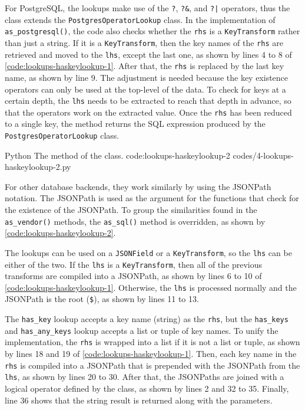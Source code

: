 For PostgreSQL, the lookups make use of the \verb|?|, \verb|?&|, and \verb=?|=
operators, thus the class extends the \verb|PostgresOperatorLookup| class. In
the implementation of \verb|as_postgresql()|, the code also checks whether the
\verb|rhs| is a \verb|KeyTransform| rather than just a string. If it is a
\verb|KeyTransform|, then the key names of the \verb|rhs| are retrieved and
moved to the \verb|lhs|, except the last one, as shown by lines 4 to 8 of
\autoref{code:lookups-haskeylookup-1}. After that, the \verb|rhs| is replaced
by the last key name, as shown by line 9. The adjustment is needed because the
key existence operators can only be used at the top-level of the data. To
check for keys at a certain depth, the \verb|lhs| needs to be extracted to
reach that depth in advance, so that the operators work on the extracted value.
Once the \verb|rhs| has been reduced to a single key, the method returns the
SQL expression produced by the \verb|PostgresOperatorLookup| class.

\listing
{Python}
{The  method of the  class.}
{code:lookups-haskeylookup-2}
{codes/4-lookups-haskeylookup-2.py}

For other database backends, they work similarly by using the JSONPath
notation. The JSONPath is used as the argument for the functions that check for
the existence of the JSONPath. To group the similarities found in the
\verb|as_vendor()| methods, the \verb|as_sql()| method is overridden, as shown
by \autoref{code:lookups-haskeylookup-2}.

The lookups can be used on a \verb|JSONField| or a \verb|KeyTransform|, so the
\verb|lhs| can be either of the two. If the \verb|lhs| is a
\verb|KeyTransform|, then all of the previous transforms are compiled into a
JSONPath, as shown by lines 6 to 10 of \autoref{code:lookups-haskeylookup-1}.
Otherwise, the \verb|lhs| is processed normally and the JSONPath is the root
(\verb|$|), as shown by lines 11 to 13.

The \verb|has_key| lookup accepts a key name (string) as the \verb|rhs|, but
the \verb|has_keys| and \verb|has_any_keys| lookup accepts a list or tuple of
key names. To unify the implementation, the \verb|rhs| is wrapped into a list
if it is not a list or tuple, as shown by lines 18 and 19 of
\autoref{code:lookups-haskeylookup-1}. Then, each key name in the \verb|rhs| is
compiled into a JSONPath that is prepended with the JSONPath from the
\verb|lhs|, as shown by lines 20 to 30. After that, the JSONPaths are joined
with a logical operator defined by the class, as shown by lines 2 and 32 to 35.
Finally, line 36 shows that the string result is returned along with the
parameters.

